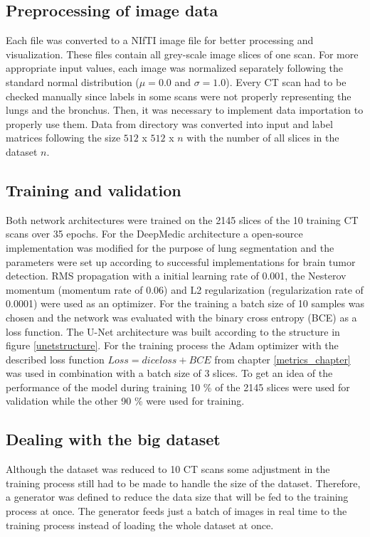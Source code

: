 \subsection{Preprocessing of image data}
Each file was converted to a NIfTI image file for better processing and visualization. These files contain all grey-scale image slices of one scan. For more appropriate input values, each image was normalized separately following the standard normal distribution ($\mu = 0.0$ and $\sigma = 1.0$). Every CT scan had to be checked manually since labels in some scans were not properly representing the lungs and the bronchus.\newline
Then, it was necessary to implement data importation to properly use them. Data from directory was converted into input and label matrices following the size $512$ x $512$ x $n$ with the number of all slices in the dataset $n$.

\subsection{Training and validation}
Both network architectures were trained on the 2145 slices of the 10 training CT scans over 35 epochs.\newline
For the DeepMedic architecture a open-source implementation \cite{deepmedic} was modified for the purpose of lung segmentation and the parameters were set up according to successful implementations for brain tumor detection. RMS propagation with a initial learning rate of 0.001, the Nesterov momentum (momentum rate of 0.06) and L2 regularization (regularization rate of 0.0001) were used as an optimizer. For the training a batch size of 10 samples was chosen and the network was evaluated with the binary cross entropy (BCE) as a loss function.\newline
The U-Net architecture was built according to the structure in figure \ref{unetstructure}. For the training process the Adam optimizer with the described loss function $Loss = dice loss + BCE$ from chapter \ref{metrics_chapter} was used in combination with a batch size of 3 slices. To get an idea of the performance of the model during training 10 \% of the 2145 slices were used for validation while the other 90 \% were used for training.\newline

\subsection{Dealing with the big dataset}
Although the dataset was reduced to 10 CT scans some adjustment in the training process still had to be made to handle the size of the dataset.\newline
Therefore, a generator was defined to reduce the data size that will be fed to the training process at once. The generator feeds just a batch of images in real time to the training process instead of loading the whole dataset at once.

